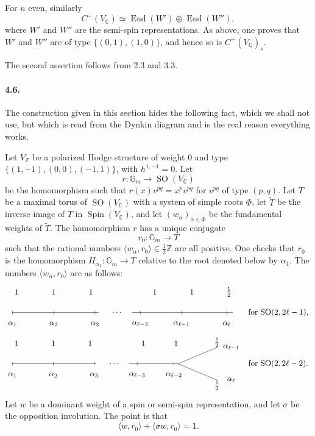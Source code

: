\documentclass[10pt]{article}
\newcommand{\C}{\mathbb{C}}
\newcommand{\Q}{\mathbb{Q}}
\newcommand{\Z}{\mathbb{Z}}
\newcommand{\Gm}{\mathbb{G}_m}
\newcommand{\End}{\operatorname{End}}
\newcommand{\SO}{\operatorname{SO}}
\newcommand{\Spin}{\operatorname{Spin}}
\begin{document}
For $n$ even, similarly
\[
C^+(V_\C)\simeq\End(W')\oplus\End(W''),
\]
where $W'$ and $W''$ are the semi-spin representations. As above, one proves that $W'$ and $W''$ are of type $\{(0,1),(1,0)\}$, and hence so is $C^+(V_\Q)_s$.

The second assertion follows from 2.3 and 3.3.

\paragraph{4.6.} The construction given in this section hides the following fact, which we shall not use, but which is read from the Dynkin diagram and is the real reason everything works.

Let $V_\Z$ be a polarized Hodge structure of weight $0$ and type $\{(1,-1),(0,0),(-1,1)\}$, with $h^{1,-1}=0$. Let
\[
r:\Gm\longrightarrow\SO(V_\C)
\]
be the homomorphism such that $r(x)v^{pq}=x^p v^{pq}$ for $v^{pq}$ of type $(p,q)$. Let $T$ be a maximal torus of $\SO(V_\C)$ with a system of simple roots $\Phi$, let $\widetilde T$ be the inverse image of $T$ in $\Spin(V_\C)$, and let $(w_\alpha)_{\alpha\in\Phi}$ be the fundamental weights of $\widetilde T$. The homomorphism $r$ has a unique conjugate
\[
r_0:\Gm\longrightarrow T
\]
such that the rational numbers $\langle w_\alpha,r_0\rangle\in\frac12\Z$ are all positive. One checks that $r_0$ is the homomorphism $H_{\alpha_1}:\Gm\to T$ relative to the root denoted below by $\alpha_1$. The numbers $\langle w_\alpha,r_0\rangle$ are as follows:
\[
\begin{tikzpicture}[baseline={(current bounding box.center)},scale=0.9]
\node at (-0.8,1.0) {$1$};\node at (1.0,1.0) {$1$};\node at (2.8,1.0) {$1$};
\node at (5.9,1.0) {$1$};\node at (7.7,1.0) {$1$};\node at (9.5,1.0) {$\frac12$};
\draw (-1,0)--(3.2,0); \draw (4.8,0)--(9.7,0);
\foreach \x/\a in {-1/\alpha_1,1/\alpha_2,3/\alpha_3,5.2/\alpha_{\ell-2},7.2/\alpha_{\ell-1},9.4/\alpha_\ell}
{\draw (\x,0.08)--(\x,-0.08); \node at (\x,-0.55) {$\a$};}
\node at (4.1,0) {$\cdots$};
\node at (11.9,0) {for $\SO(2,2\ell-1)$,};
\end{tikzpicture}
\]
\[
\begin{tikzpicture}[baseline={(current bounding box.center)},scale=0.9]
\node at (-0.8,1.0) {$1$};\node at (1.0,1.0) {$1$};\node at (2.8,1.0) {$1$};
\node at (5.4,1.0) {$1$};\node at (7.0,1.0) {$1$};\node at (9.0,1.05) {$\frac12$};\node at (9.0,-1.05) {$\frac12$};
\draw (-1,0)--(3.1,0); \draw (4.7,0)--(7.1,0);
\draw (7.1,0)--(9.0,0.8); \draw (7.1,0)--(9.0,-0.8);
\foreach \x/\a in {-1/\alpha_1,1/\alpha_2,3/\alpha_3,5.1/\alpha_{\ell-3},6.9/\alpha_{\ell-2}}
{\draw (\x,0.08)--(\x,-0.08); \node at (\x,-0.55) {$\a$};}
\node at (4.0,0) {$\cdots$};
\node at (9.7,0.8) {$\alpha_{\ell-1}$};
\node at (9.7,-0.8) {$\alpha_\ell$};
\node at (12.0,0) {for $\SO(2,2\ell-2)$.};
\end{tikzpicture}
\]
Let $w$ be a dominant weight of a spin or semi-spin representation, and let $\sigma$ be the opposition involution. The point is that
\[
\langle w,r_0\rangle+\langle\sigma w,r_0\rangle=1.
\]
\end{document}
